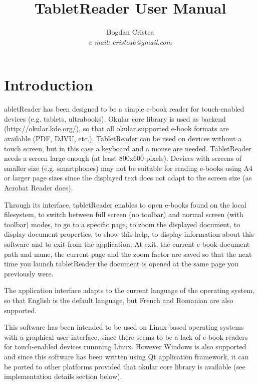 \documentclass[journal,12pt]{IEEEtran}
\begin{document}
\title{TabletReader User Manual}
\author{Bogdan Cristea\\\textit{e-mail: cristeab@gmail.com}}

\maketitle

\section{Introduction}

abletReader has been designed to be a simple e-book reader for touch-enabled devices (e.g. tablets, ultrabooks). Okular core library is used as backend (http://okular.kde.org/), so that all okular supported e-book formats are available (PDF, DJVU, etc.). TabletReader can be used on devices without a touch screen, but in this case a keyboard and a mouse are needed. TabletReader needs a screen large enough (at least 800x600 pixels). Devices with screens of smaller size (e.g. smartphones) may not be suitable for reading e-books using A4 or larger page sizes since the displayed text does not adapt to the screen size (as Acrobat Reader does).

Through its interface, tabletReader enables to open e-books found on the local filesystem, to switch between full screen (no toolbar) and normal screen (with toolbar) modes, to go to a specific page, to zoom the displayed document, to display document properties, to show this help, to display information about this software and to exit from the application. At exit, the current e-book document path and name, the current page and the zoom factor are saved so that the next time you launch tabletReader the document is opened at the same page you previously were. 

The application interface adapts to the current language of the operating system, so that English is the default language, but French and Romanian are also supported.

This software has been intended to be used on Linux-based operating systems with a graphical user interface, since there seems to be a lack of e-book readers for touch-enabled devices runnning Linux. However Windows is also supported and since this software has been written using Qt application framework, it can be ported to other platforms provided that okular core library is available (see implementation details section below).
\end{document}
